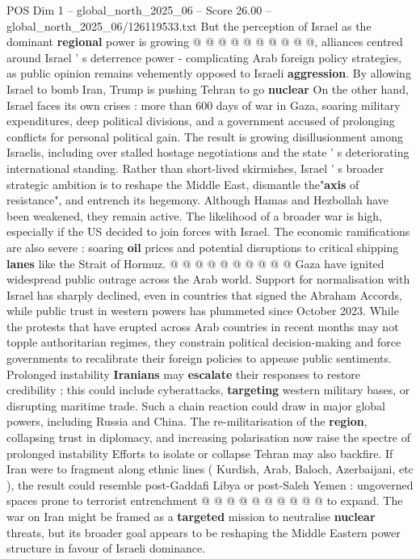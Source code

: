 \begin{textsample}{POS Dim 1 – global\_north\_2025\_06 – Score 26.00 – global\_north\_2025\_06/126119533.txt}
But the perception of Israel as the dominant \textbf{regional} power is growing @ @ @ @ @ @ @ @ @ @, alliances centred around Israel ' s deterrence power - complicating Arab foreign policy strategies, as public opinion remains vehemently opposed to Israeli \textbf{aggression}.
By allowing Israel to bomb Iran, Trump is pushing Tehran to go \textbf{nuclear} On the other hand, Israel faces its own crises : more than 600 days of war in Gaza, soaring military expenditures, deep political divisions, and a government accused of prolonging conflicts for personal political gain.
The result is growing disillusionment among Israelis, including over stalled hostage negotiations and the state ' s deteriorating international standing.
Rather than short-lived skirmishes, Israel ' s broader strategic ambition is to reshape the Middle East, dismantle the"\textbf{axis} of resistance", and entrench its hegemony.
Although Hamas and Hezbollah have been weakened, they remain active.
The likelihood of a broader war is high, especially if the US decided to join forces with Israel.
The economic ramifications are also severe : soaring \textbf{oil} prices and potential disruptions to critical shipping \textbf{lanes} like the Strait of Hormuz. @ @ @ @ @ @ @ @ @ @ Gaza have ignited widespread public outrage across the Arab world.
Support for normalisation with Israel has sharply declined, even in countries that signed the Abraham Accords, while public trust in western powers has plummeted since October 2023.
While the protests that have erupted across Arab countries in recent months may not topple authoritarian regimes, they constrain political decision-making and force governments to recalibrate their foreign policies to appease public sentiments.
Prolonged instability \textbf{Iranians} may \textbf{escalate} their responses to restore credibility ; this could include cyberattacks, \textbf{targeting} western military bases, or disrupting maritime trade.
Such a chain reaction could draw in major global powers, including Russia and China.
The re-militarisation of the \textbf{region}, collapsing trust in diplomacy, and increasing polarisation now raise the spectre of prolonged instability Efforts to isolate or collapse Tehran may also backfire.
If Iran were to fragment along ethnic lines ( Kurdish, Arab, Baloch, Azerbaijani, etc ), the result could resemble post-Gaddafi Libya or post-Saleh Yemen : ungoverned spaces prone to terrorist entrenchment @ @ @ @ @ @ @ @ @ @ to expand.
The war on Iran might be framed as a \textbf{targeted} mission to neutralise \textbf{nuclear} threats, but its broader goal appears to be reshaping the Middle Eastern power structure in favour of Israeli dominance.

\end{textsample}
